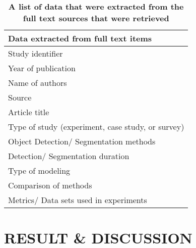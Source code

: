 \documentclass[two column]{ieeeaccess}
\begin{document}
\begin{table}[h]
\begin{center}
\caption{\textbf{A list of data that were extracted from the full text sources that were retrieved }}
\begin{tabular}{l}
\hline
        Data extracted from full text items    \\ 
\hline
        Study identifier \\
        Year of publication \\
        Name of authors \\
        Source \\
        Article title \\
        Type of study (experiment, case study, or survey) \\
        Object Detection/ Segmentation methods \\
        Detection/ Segmentation duration \\
        Type of modeling \\
        Comparison of methods \\
        Metrics/ Data sets used in experiments \\
\hline
\end{tabular}
\end{center}
\end{table}

\section{RESULT \& DISCUSSION}
\end{document}
